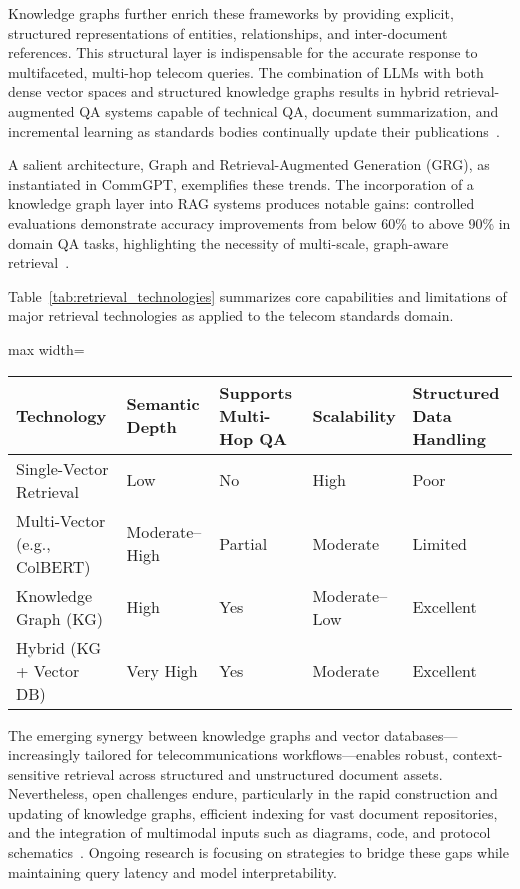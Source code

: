 \documentclass[sigconf]{acmart}
\begin{document}
Knowledge graphs further enrich these frameworks by providing explicit, structured representations of entities, relationships, and inter-document references. This structural layer is indispensable for the accurate response to multifaceted, multi-hop telecom queries. The combination of LLMs with both dense vector spaces and structured knowledge graphs results in hybrid retrieval-augmented QA systems capable of technical QA, document summarization, and incremental learning as standards bodies continually update their publications~\cite{ref16,ref20}.

A salient architecture, Graph and Retrieval-Augmented Generation (GRG), as instantiated in CommGPT, exemplifies these trends. The incorporation of a knowledge graph layer into RAG systems produces notable gains: controlled evaluations demonstrate accuracy improvements from below 60\% to above 90\% in domain QA tasks, highlighting the necessity of multi-scale, graph-aware retrieval~\cite{ref21}.

Table~\ref{tab:retrieval_technologies} summarizes core capabilities and limitations of major retrieval technologies as applied to the telecom standards domain.

\begin{table*}[htbp]
\centering
\caption{Characteristics of Retrieval and Indexing Technologies for Telecom Standards QA}
\label{tab:retrieval_technologies}
\begin{adjustbox}{max width=\textwidth}
\begin{tabular}{lllll}
\toprule
\textbf{Technology} & \textbf{Semantic Depth} & \textbf{Supports Multi-Hop QA} & \textbf{Scalability} & \textbf{Structured Data Handling} \\
\midrule
Single-Vector Retrieval & Low & No & High & Poor \\
Multi-Vector (e.g., ColBERT) & Moderate--High & Partial & Moderate & Limited \\
Knowledge Graph (KG) & High & Yes & Moderate--Low & Excellent \\
Hybrid (KG + Vector DB) & Very High & Yes & Moderate & Excellent \\
\bottomrule
\end{tabular}
\end{adjustbox}
\end{table*}

The emerging synergy between knowledge graphs and vector databases---increasingly tailored for telecommunications workflows---enables robust, context-sensitive retrieval across structured and unstructured document assets. Nevertheless, open challenges endure, particularly in the rapid construction and updating of knowledge graphs, efficient indexing for vast document repositories, and the integration of multimodal inputs such as diagrams, code, and protocol schematics~\cite{ref20,ref21,ref26}. Ongoing research is focusing on strategies to bridge these gaps while maintaining query latency and model interpretability.
\end{document}

